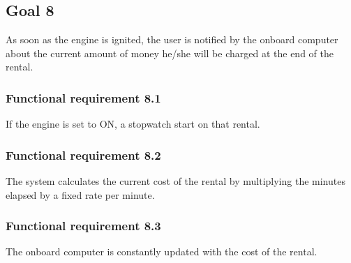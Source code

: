 \subsection{Goal 8}
As soon as the engine is ignited, the user is notified by the onboard computer about the current amount of money he/she will be charged at the end of the rental.
\setcounter{secnumdepth}{3}
\subsubsection{Functional requirement 8.1}
If the engine is set to ON, a stopwatch start on that rental.

\subsubsection{Functional requirement 8.2}
The system calculates the current cost of the rental by multiplying the minutes elapsed by a fixed rate per minute.

\subsubsection{Functional requirement 8.3}
The onboard computer is constantly updated with the cost of the rental.